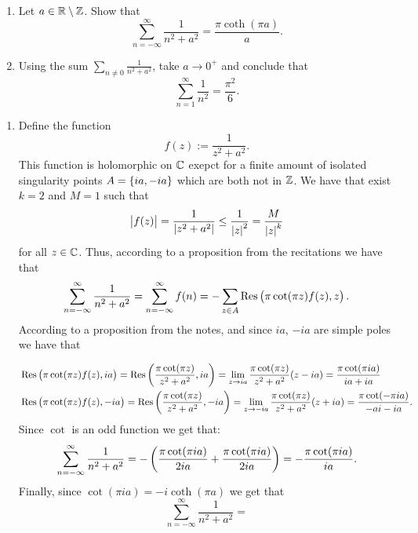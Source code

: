 \documentclass[11pt,a4paper]{article}
\begin{document}
\begin{exercise} \phantom{}
  \begin{enumerate}
    \item[(1)] Let $a \in \mathbb{R} \setminus \mathbb{Z}$.
      Show that
      \[
        \sum_{n=-\infty}^{\infty} \frac{1}{n^2 + a^2} =
        \frac{\pi \coth(\pi a)}{a}.
      \]
    \item[(2)] Using the sum $\sum_{n \neq 0} \frac{1}{n^2 + a^2}$,
      take $a \to 0^+$ and conclude that
      \[
        \sum_{n=1}^{\infty} \frac{1}{n^2} = \frac{\pi^2}{6}.
      \]
  \end{enumerate}
\end{exercise}
\begin{solution} \phantom{}
\begin{enumerate}
  \item[(1)] Define the function
    \[
      f(z) := \frac{1}{z^2 + a^2}.
    \]
    This function is holomorphic on $\mathbb{C}$ exepct for a finite amount of
    isolated singularity points $A = \left\{ia, -ia\right\}$ which are both not in $\mathbb{Z}$.
    We have that exist $k = 2$ and $M = 1$ such that
    \[
      \left\lvert f(z)\right\rvert =
      \frac{1}{\left\lvert z^2 + a^2\right\rvert} \le
      \frac{1}{\left\lvert z\right\rvert^2} =
      \frac{M}{\left\lvert z\right\rvert^k}
    \]
    for all $z \in \mathbb{C}$.
    Thus, according to a proposition from the recitations we have that
    \[
      \sum_{n=-\infty}^{\infty} \frac{1}{n^2 + a^2} =
      \sum_{n=-\infty}^{\infty} f(n) =
      - \sum_{z \in A} \Res\del{\pi \cot(\pi z) f(z), z}.
    \]
    According to a proposition from the notes, and since $ia$, $-ia$
    are simple poles we have that
    \begin{small}
    \begin{align*}
      &\Res\del{\pi \cot(\pi z) f(z), ia} =
      \Res\del{\frac{\pi \cot(\pi z)}{z^2 + a^2}, ia} =
      \lim_{z \to ia} \frac{\pi \cot(\pi z)}{z^2 + a^2} (z - ia) =
      \frac{\pi \cot(\pi i a)}{i a + i a} \\
      &\Res\del{\pi \cot(\pi z) f(z), -ia} =
      \Res\del{\frac{\pi \cot(\pi z)}{z^2 + a^2}, -ia} =
      \lim_{z \to -ia} \frac{\pi \cot(\pi z)}{z^2 + a^2} (z + ia) =
      \frac{\pi \cot(- \pi i a)}{- ai - i a}.
    \end{align*}
    Since $\cot$ is an odd function we get that:
    \[
      \sum_{n=-\infty}^{\infty} \frac{1}{n^2 + a^2} =
      - \del{\frac{\pi \cot(\pi i a)}{2 i a} + \frac{\pi \cot(\pi i a)}{2 i a}} =
      - \frac{\pi \cot(\pi i a)}{i a}.
    \]
    Finally, since $\cot(\pi i a) = - i \coth(\pi a)$ we get that
    \[
      \sum_{n=-\infty}^{\infty} \frac{1}{n^2 + a^2} =
\]
\end{small}
\end{enumerate}
\end{solution}
\end{document}
